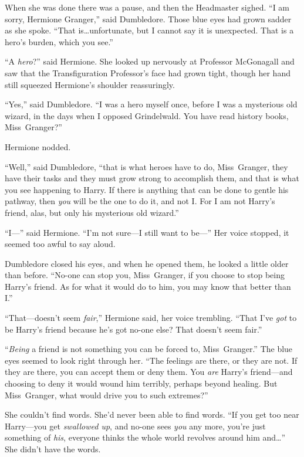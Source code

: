 When she was done there was a pause, and then the Headmaster sighed.
“I am sorry, Hermione Granger,” said Dumbledore. Those blue eyes had grown sadder as she spoke.
“That is…unfortunate, but I cannot say it is unexpected. That is a hero’s burden, which you see.”

“A \emph{hero}?” said Hermione. She looked up nervously at Professor McGonagall and saw that the Transfiguration Professor’s face had grown tight, though her hand still squeezed Hermione’s shoulder reassuringly.

“Yes,” said Dumbledore.
“I was a hero myself once, before I was a mysterious old wizard, in the days when I opposed Grindelwald. You have read history books, Miss~Granger?”

Hermione nodded.

“Well,” said Dumbledore, “that is what heroes have to do, Miss~Granger, they have their tasks and they must grow strong to accomplish them, and that is what you see happening to Harry. If there is anything that can be done to gentle his pathway, then \emph{you} will be the one to do it, and not I\@. For I am not Harry’s friend, alas, but only his mysterious old wizard.”

“I—” said Hermione.
“I’m not sure—I still want to be—” Her voice stopped, it seemed too awful to say aloud.

Dumbledore closed his eyes, and when he opened them, he looked a little older than before.
“No-one can stop you, Miss~Granger, if you choose to stop being Harry’s friend. As for what it would do to him, you may know that better than I.”

“That—doesn’t seem \emph{fair},” Hermione said, her voice trembling.
“That I’ve \emph{got} to be Harry’s friend because he’s got no-one else? That doesn’t seem fair.”

“\emph{Being} a friend is not something you can be forced to, Miss~Granger.” The blue eyes seemed to look right through her.
“The feelings are there, or they are not. If they are there, you can accept them or deny them. You \emph{are} Harry’s friend—and choosing to deny it would wound him terribly, perhaps beyond healing. But Miss~Granger, what would drive you to such extremes?”

She couldn’t find words. She’d never been able to find words.
“If you get too near Harry—you get \emph{swallowed up}, and no-one sees \emph{you} any more, you’re just something of \emph{his}, everyone thinks the whole world revolves around him and…” She didn’t have the words.

